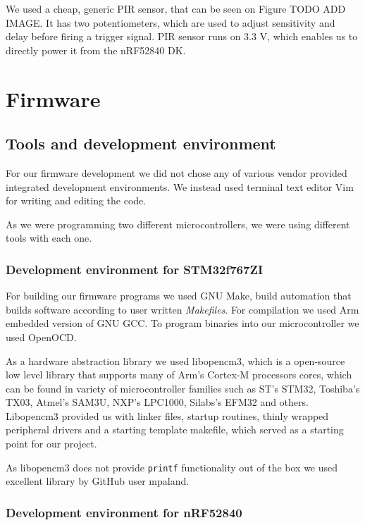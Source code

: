 We used a cheap, generic PIR sensor, that can be seen on Figure TODO ADD IMAGE.
It has two potentiometers, which are used to adjust sensitivity and delay before firing a trigger signal.
PIR sensor runs on 3.3 V, which enables us to directly power it from the nRF52840 DK. 



\section{ Firmware}


\subsection{ Tools and development environment}

For our firmware development we did not chose any of various vendor provided integrated development environments.
We instead used terminal text editor Vim for writing and editing the code.

As we were programming two different microcontrollers, we were using different tools with each one.


\subsubsection{ Development environment for STM32f767ZI}

For building our firmware programs we used GNU Make, build automation that builds software according to user written \textit{Makefiles}.
For compilation we used Arm embedded version of GNU GCC.
To program binaries into our microcontroller we used OpenOCD.

As a hardware abstraction library we used libopencm3, which is a open-source low level library that supports many of Arm's Cortex-M processors cores, which can be found in variety of microcontroller families such as ST's STM32, Toshiba's TX03, Atmel's SAM3U, NXP's LPC1000, Silabs's EFM32 and others.
Libopencm3 provided us with linker files, startup routines, thinly wrapped peripheral drivers and a starting template makefile, which served as a starting point for our project.

As libopencm3 does not provide \verb|printf| functionality out of the box we used excellent library by GitHub user mpaland\cite{printf_lib}.


\subsubsection{ Development environment for nRF52840}

